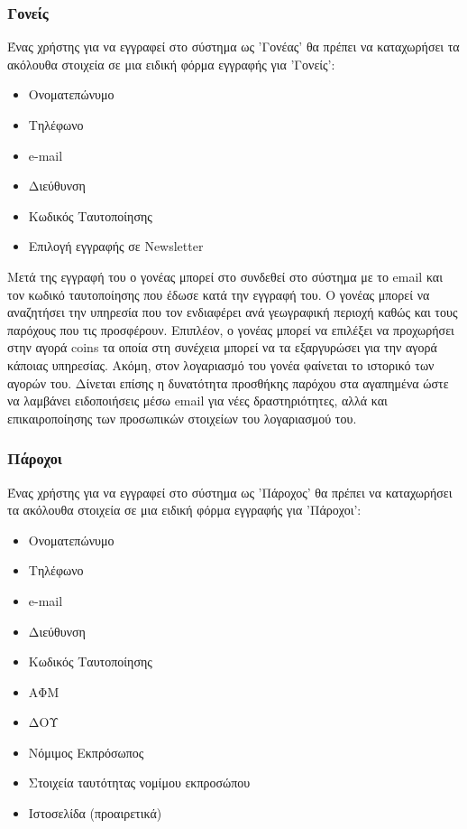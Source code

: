 \documentclass[letterpaper,6pt]{article}
\begin{document}
\subsubsection{Γονείς}
Ένας χρήστης για να εγγραφεί στο σύστημα ως 'Γονέας' θα πρέπει να καταχωρήσει τα ακόλουθα στοιχεία σε μια ειδική φόρμα εγγραφής για 'Γονείς':
\begin{itemize}
  \item Ονοματεπώνυμο
  \item Τηλέφωνο
  \item e-mail
  \item Διεύθυνση
  \item Κωδικός Ταυτοποίησης
  \item Επιλογή εγγραφής σε Newsletter
\end{itemize}
Μετά της εγγραφή του ο γονέας μπορεί στο συνδεθεί στο σύστημα με το email και τον κωδικό ταυτοποίησης που έδωσε κατά την εγγραφή του. Ο γονέας μπορεί να αναζητήσει την υπηρεσία που τον ενδιαφέρει ανά γεωγραφική περιοχή καθώς και τους παρόχους που τις προσφέρουν. Επιπλέον, ο γονέας μπορεί να επιλέξει να προχωρήσει στην αγορά coins τα οποία στη συνέχεια μπορεί να τα εξαργυρώσει για την αγορά κάποιας υπηρεσίας. Ακόμη, στον λογαριασμό του γονέα φαίνεται το ιστορικό των αγορών του. Δίνεται επίσης η δυνατότητα προσθήκης παρόχου στα αγαπημένα ώστε να λαμβάνει ειδοποιήσεις μέσω email για νέες δραστηριότητες, αλλά και επικαιροποίησης των προσωπικών στοιχείων του λογαριασμού του.
\subsubsection{Πάροχοι}
Ένας χρήστης για να εγγραφεί στο σύστημα ως 'Πάροχος' θα πρέπει να καταχωρήσει τα ακόλουθα στοιχεία σε μια ειδική φόρμα εγγραφής για 'Πάροχοι':
\begin{itemize}
  \item Ονοματεπώνυμο
  \item Τηλέφωνο
  \item e-mail
  \item Διεύθυνση
  \item Κωδικός Ταυτοποίησης
  \item ΑΦΜ
  \item ΔΟΥ
  \item Νόμιμος Εκπρόσωπος
  \item Στοιχεία ταυτότητας νομίμου εκπροσώπου
  \item Ιστοσελίδα (προαιρετικά)
\end{itemize}
\end{document}
